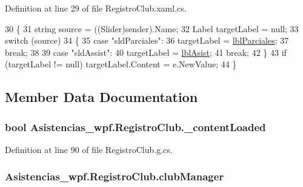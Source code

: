 Definition at line 29 of file Registro\-Club.\-xaml.\-cs.


\begin{DoxyCode}
30         \{
31             \textcolor{keywordtype}{string} source = ((Slider)sender).Name;
32             Label targetLabel = null;
33             \textcolor{keywordflow}{switch} (source)
34             \{
35                 \textcolor{keywordflow}{case} \textcolor{stringliteral}{"sldParciales"}:
36                     targetLabel = \hyperlink{class_asistencias__wpf_1_1_registro_club_af0b4a33c9ec145c096e5827435a5e58c}{lblParciales};
37                     \textcolor{keywordflow}{break};
38 
39                 \textcolor{keywordflow}{case} \textcolor{stringliteral}{"sldAssist"}:
40                     targetLabel = \hyperlink{class_asistencias__wpf_1_1_registro_club_a974cf03e0b78ba0f297e64b0143ff51c}{lblAsist};
41                     \textcolor{keywordflow}{break};
42             \}
43             \textcolor{keywordflow}{if} (targetLabel != null) targetLabel.Content = e.NewValue;
44         \}
\end{DoxyCode}


\subsection{Member Data Documentation}
\hypertarget{class_asistencias__wpf_1_1_registro_club_a6b831e3384ba2a005329c188788173a0}{
\subsubsection[{\-\_\-content\-Loaded}]{\setlength{\rightskip}{0pt plus 5cm}bool Asistencias\-\_\-wpf.\-Registro\-Club.\-\_\-content\-Loaded\hspace{0.3cm}{\ttfamily [private]}}}\label{class_asistencias__wpf_1_1_registro_club_a6b831e3384ba2a005329c188788173a0}


Definition at line 90 of file Registro\-Club.\-g.\-cs.

\hypertarget{class_asistencias__wpf_1_1_registro_club_a33dbab4a0d0290fb0bac27adfed8b978}{
\subsubsection[{club\-Manager}]{ Asistencias\-\_\-wpf.\-Registro\-Club.\-club\-Manager\hspace{0.3cm}{\ttfamily [private]}}}\label{class_asistencias__wpf_1_1_registro_club_a33dbab4a0d0290fb0bac27adfed8b978}


